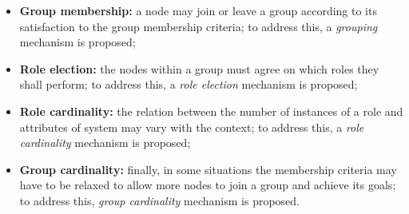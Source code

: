 


%	
%	
%	


\begin{itemize}
	
	\item \textbf{Group membership:} a node may join or leave a group according to its satisfaction to the group membership criteria; to address this, a \textit{grouping} mechanism is proposed;
	
	\item \textbf{Role election:} the nodes within a group must agree on which roles they shall perform; to address this, a  \textit{role election} mechanism is proposed;
	
	\item \textbf{Role cardinality:} the relation between the number of instances of a role and attributes of system may vary with the context; to address this, a \textit{role cardinality}  mechanism is proposed;
	
	\item \textbf{Group cardinality:} finally, in some situations the membership criteria may have to be relaxed to allow more nodes to join a group and achieve its goals; to address this, \textit{group cardinality} mechanism is proposed.
	
\end{itemize}


